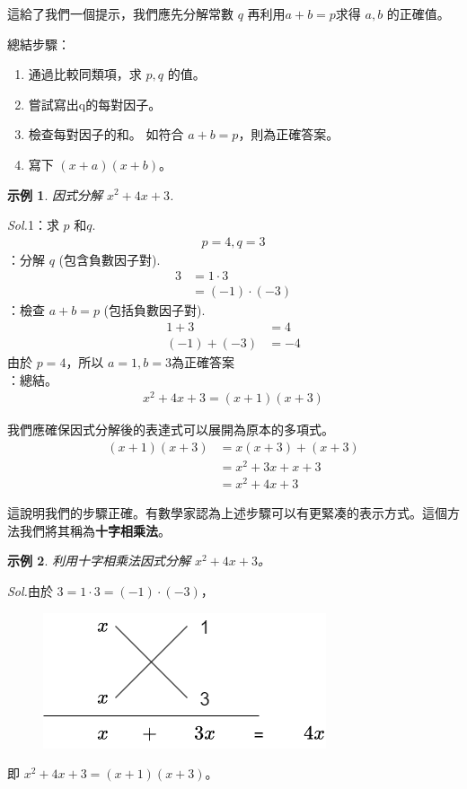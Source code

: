 \documentclass[12pt]{article}
\newtheorem{example}{示例}
\begin{document}
    這給了我們一個提示，我們應先分解常數 $q$ 再利用$a+b=p$求得 $a,b$ 的正確值。

    總結步驟：\begin{enumerate}
        \item 通過比較同類項，求 $p,q$ 的值。
        \item 嘗試寫出q的每對因子。
        \item 檢查每對因子的和。 如符合 $a+b=p$，則為正確答案。
        \item 寫下 $(x+a)(x+b)$。
    \end{enumerate}

    \begin{example}
        因式分解 $x^2+4x+3$.
    \end{example}

    \textit{ Sol.}1：求 $p$ 和$q$.
    \begin{align*}
        p=4, q=3
    \end{align*}
    \indent {}：分解 $q$ (包含負數因子對).
    \begin{align*}
        3&=1\cdot 3\\
        &=(-1)\cdot(-3)
    \end{align*}
    \indent {}：檢查 $a+b=p$ (包括負數因子對).
    \begin{align*}
        1+3&=4\\
        (-1)+(-3)&=-4
    \end{align*}
    \indent \indent \indent 由於 $p=4$，所以 $a=1,b=3$為正確答案\\
    \indent {}：總結。
    \begin{align*}
        x^2+4x+3=(x+1)(x+3)
    \end{align*}

    我們應確保因式分解後的表達式可以展開為原本的多項式。\begin{align*}
        (x+1)(x+3)&=x(x+3)+(x+3)\\
        &=x^2+3x+x+3\\
        &=x^2+4x+3
    \end{align*}

    這說明我們的步驟正確。有數學家認為上述步驟可以有更緊凑的表示方式。這個方法我們將其稱為\textbf{十字相乘法}。
    
    \begin{example}
        利用十字相乘法因式分解 $x^2+4x+3$。
    \end{example}

    \textit{ Sol.}由於 $3=1\cdot 3=(-1)\cdot(-3)$，
    \begin{figure}[H]
        \centering
        \includegraphics[scale=0.6]{cross-method}
    \end{figure}
    \indent \indent 即 $x^2+4x+3=(x+1)(x+3)$。
\end{document}
